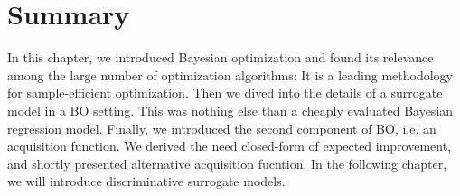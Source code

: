 \section{Summary}
In this chapter, we introduced Bayesian optimization and found its relevance among the large number
of optimization algorithms: It is a leading methodology for sample-efficient optimization. Then we
dived into the details of a surrogate model in a BO setting. This was nothing else than a cheaply
evaluated Bayesian regression model. Finally, we introduced the second component of BO, i.e. an
acquisition function. We derived the need closed-form of expected improvement, and shortly presented
alternative acquisition fucntion. In the following chapter, we will introduce discriminative
surrogate models. 









